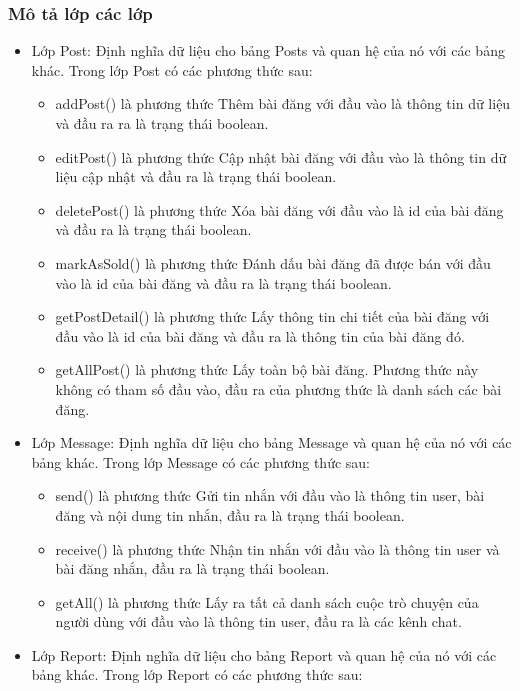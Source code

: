 \documentclass[../DoAn.tex]{subfiles}
\begin{document}
\subsubsection{Mô tả lớp các lớp}
\begin{itemize}
    \item Lớp Post: Định nghĩa dữ liệu cho bảng Posts và quan hệ của nó với các bảng khác. Trong lớp Post có các phương thức sau:
        \begin{itemize}
            \item addPost() là phương thức Thêm bài đăng với đầu vào là thông tin dữ liệu và đầu ra ra là trạng thái boolean.
            \item editPost() là phương thức Cập nhật bài đăng với đầu vào là thông tin dữ liệu cập nhật và đầu ra là trạng thái boolean.
            \item deletePost() là phương thức Xóa bài đăng với đầu vào là id của bài đăng và đầu ra là trạng thái boolean.
            \item markAsSold() là phương thức Đánh dấu bài đăng đã được bán với đầu vào là id của bài đăng và đầu ra là trạng thái boolean.
            \item getPostDetail() là phương thức Lấy thông tin chi tiết của bài đăng với đầu vào là id của bài đăng và đầu ra là thông tin của bài đăng đó.
             \item getAllPost() là phương thức Lấy toàn bộ bài đăng. Phương thức này không có tham số đầu vào, đầu ra của phương thức là danh sách các bài đăng.
        \end{itemize}
    \item Lớp Message: Định nghĩa dữ liệu cho bảng Message và quan hệ của nó với các bảng khác. Trong lớp Message có các phương thức sau:
        \begin{itemize}
            \item send() là phương thức Gửi tin nhắn với đầu vào là thông tin user, bài đăng và nội dung tin nhắn, đầu ra là trạng thái boolean.
            \item receive() là phương thức  Nhận tin nhắn với đầu vào là thông tin user và bài đăng nhắn, đầu ra là trạng thái boolean.
            \item getAll() là phương thức Lấy ra tất cả danh sách cuộc trò chuyện của người dùng với đầu vào là thông tin user, đầu ra là các kênh chat.
        \end{itemize}
    \item Lớp Report: Định nghĩa dữ liệu cho bảng Report và quan hệ của nó với các bảng khác. Trong lớp Report có các phương thức sau:

\end{itemize}
\end{document}
